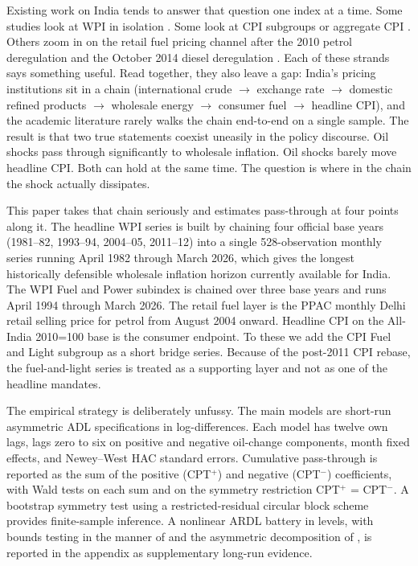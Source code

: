 \documentclass[11pt,a4paper]{article}
\begin{document}
Existing work on India tends to answer that question one index at a time. Some studies look at WPI in isolation \citep{bhoi2012,suresh2026}. Some look at CPI subgroups or aggregate CPI \citep{abubakar2018,sek2019}. Others zoom in on the retail fuel pricing channel after the 2010 petrol deregulation and the October 2014 diesel deregulation \citep{pradeep2022,deheri2024}. Each of these strands says something useful. Read together, they also leave a gap: India's pricing institutions sit in a chain (international crude $\to$ exchange rate $\to$ domestic refined products $\to$ wholesale energy $\to$ consumer fuel $\to$ headline CPI), and the academic literature rarely walks the chain end-to-end on a single sample. The result is that two true statements coexist uneasily in the policy discourse. Oil shocks pass through significantly to wholesale inflation. Oil shocks barely move headline CPI. Both can hold at the same time. The question is where in the chain the shock actually dissipates.

This paper takes that chain seriously and estimates pass-through at four points along it. The headline WPI series is built by chaining four official base years (1981--82, 1993--94, 2004--05, 2011--12) into a single 528-observation monthly series running April 1982 through March 2026, which gives the longest historically defensible wholesale inflation horizon currently available for India. The WPI Fuel and Power subindex is chained over three base years and runs April 1994 through March 2026. The retail fuel layer is the PPAC monthly Delhi retail selling price for petrol from August 2004 onward. Headline CPI on the All-India 2010=100 base is the consumer endpoint. To these we add the CPI Fuel and Light subgroup as a short bridge series. Because of the post-2011 CPI rebase, the fuel-and-light series is treated as a supporting layer and not as one of the headline mandates.

The empirical strategy is deliberately unfussy. The main models are short-run asymmetric ADL specifications in log-differences. Each model has twelve own lags, lags zero to six on positive and negative oil-change components, month fixed effects, and Newey--West HAC standard errors. Cumulative pass-through is reported as the sum of the positive (CPT$^+$) and negative (CPT$^-$) coefficients, with Wald tests on each sum and on the symmetry restriction CPT$^+$ = CPT$^-$. A bootstrap symmetry test using a restricted-residual circular block scheme provides finite-sample inference. A nonlinear ARDL battery in levels, with bounds testing in the manner of \citet{pesaran2001} and the asymmetric decomposition of \citet{shin2014}, is reported in the appendix as supplementary long-run evidence.
\end{document}

